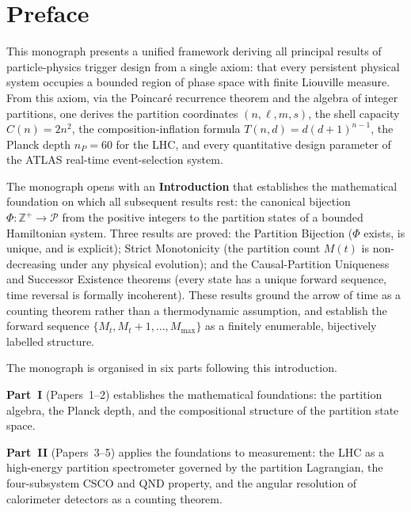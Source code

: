 \documentclass[12pt,a4paper,openany]{book}
\begin{document}
\tableofcontents
\clearpage

\chapter*{Preface}

This monograph presents a unified framework deriving all principal results
of particle-physics trigger design from a single axiom: that every persistent
physical system occupies a bounded region of phase space with finite Liouville
measure. From this axiom, via the Poincar\'e recurrence theorem and the
algebra of integer partitions, one derives the partition coordinates
$(n, \ell, m, s)$, the shell capacity $C(n) = 2n^2$, the
composition-inflation formula $T(n,d) = d(d+1)^{n-1}$, the Planck depth
$n_P = 60$ for the LHC, and every quantitative design parameter of the
ATLAS real-time event-selection system.

The monograph opens with an \textbf{Introduction} that establishes the
mathematical foundation on which all subsequent results rest: the canonical
bijection $\Phi : \mathbb{Z}^+ \to \mathcal{P}$ from the positive integers
to the partition states of a bounded Hamiltonian system. Three results are
proved: the Partition Bijection ($\Phi$ exists, is unique, and is explicit);
Strict Monotonicity (the partition count $M(t)$ is non-decreasing under any
physical evolution); and the Causal-Partition Uniqueness and Successor
Existence theorems (every state has a unique forward sequence, time reversal
is formally incoherent). These results ground the arrow of time as a
counting theorem rather than a thermodynamic assumption, and establish the
forward sequence $\{M_t, M_t+1, \ldots, M_{\max}\}$ as a finitely
enumerable, bijectively labelled structure.

The monograph is organised in six parts following this introduction.

\textbf{Part~I} (Papers~1--2) establishes the mathematical foundations:
the partition algebra, the Planck depth, and the compositional structure of
the partition state space.

\textbf{Part~II} (Papers~3--5) applies the foundations to measurement:
the LHC as a high-energy partition spectrometer governed by the partition
Lagrangian, the four-subsystem CSCO and QND property, and the angular
resolution of calorimeter detectors as a counting theorem.
\end{document}
